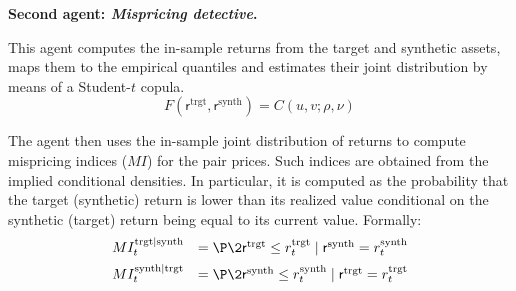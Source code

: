 



\bx 
\textbf{Second agent: \textit{Mispricing detective}.}

This agent computes the in-sample returns from the target and synthetic assets,
maps them to the empirical quantiles and estimates their joint distribution by means of a Student-$t$ copula. 
$$
F({\mathsf{r}^{\text{trgt}}, \mathsf{r}^{\text{synth}}}) = C(u,v; \rho, \nu)
$$


The agent then uses the in-sample joint distribution of returns to compute mispricing indices ($MI$) for the pair prices. Such indices are obtained from the implied conditional densities. In particular, it is computed as the probability that the target (synthetic) return is lower than its realized value conditional on the synthetic (target) return being equal to its current value. Formally: 
$$\begin{array}{llll}
MI_t^{{\text{trgt}}|{\text{synth}}} &= 
\P\2{
\mathsf{r}^{\text{trgt}} \leq r_t^{\text{trgt}} \mid \mathsf{r}^{\text{synth}} = r_t^{\text{synth}} 
}
\\[0.5em]
MI_t^{{\text{synth}}|{\text{trgt}}} &= 
\P\2{
\mathsf{r}^{\text{synth}} \leq r_t^{\text{synth}} \mid \mathsf{r}^{\text{trgt}} = r_t^{\text{trgt}} 
}
\end{array}$$

